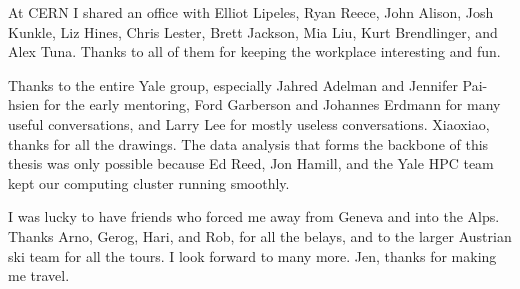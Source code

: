 At CERN I shared an office with Elliot Lipeles, Ryan Reece, John Alison, Josh Kunkle, Liz Hines, Chris Lester, Brett Jackson, Mia Liu, Kurt Brendlinger, and Alex Tuna. Thanks to all of them for keeping the workplace interesting and fun.

Thanks to the entire Yale group, especially Jahred Adelman and Jennifer Pai-hsien for the early mentoring, Ford Garberson and Johannes Erdmann for many useful conversations, and Larry Lee for mostly useless conversations. Xiaoxiao, thanks for all the drawings.
The data analysis that forms the backbone of this thesis was only possible because Ed Reed, Jon Hamill, and the Yale HPC team kept our computing cluster running smoothly.


I was lucky to have friends who forced me away from Geneva and into the Alps.
Thanks Arno, Gerog, Hari, and Rob, for all the belays, and to the larger Austrian ski team for all the tours. I look forward to many more.
Jen, thanks for making me travel.

